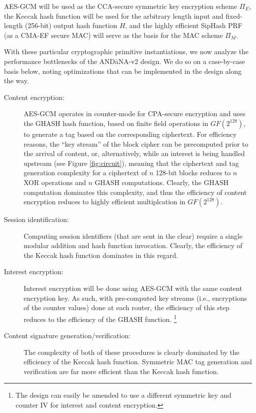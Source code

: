 \documentclass[10pt]{article}
\begin{document}

AES-GCM will be used as the CCA-secure symmetric key encryption scheme $\Pi_E$, the Keccak hash function will be used for the arbitrary length input and fixed-length (256-bit) output hash function $H$, and the highly efficient SipHash PRF (as a CMA-EF secure MAC) will serve as the basis for the MAC scheme $\Pi_M$.

With these particular cryptographic primitive instantiations, we now analyze the performance bottlenecks of the {\sf AND\=aNA-v2} design. We do so on a case-by-case basis below, noting optimizations that can be implemented in the design along the way.
\begin{description}
  \item[Content encryption:] AES-GCM operates in counter-mode for CPA-secure encryption and uses the GHASH hash function, based on finite field operations in $GF(2^{128})$, to generate a tag based on the corresponding ciphertext. For efficiency reasons, the ``key stream'' of the block cipher can be precomputed prior to the arrival of content, or, alternatively, while an interest is being handled upstream (see Figure \ref{fig:circuit}), meaning that the ciphertext and tag generation complexity for a ciphertext of $n$ 128-bit blocks reduces to $n$ XOR operations and $n$ GHASH computations. Clearly, the GHASH computation dominates this complexity, and thus the efficiency of content encryption reduces to highly efficient multiplcation in $GF(2^{128})$. 
  \item[Session identification:] Computing session identifiers (that are sent in the clear) require a single modular addition and hash function invocation. Clearly, the efficiency of the Keccak hash function dominates in this regard.
  \item[Interest encryption:] Interest encryption will be done using AES-GCM with the same content encryption key. As such, with pre-computed key streams (i.e., encryptions of the counter values) done at each router, the efficiency of this step reduces to the efficiency of the GHASH function. \footnote{The design can easily be amended to use a different symmetric key and counter IV for interest and content encryption.}
  \item[Content signature generation/verification:] The complexity of both of these procedures is clearly dominated by the efficiency of the Keccak hash function. Symmetric MAC tag generation and verification are far more efficient than the Keccak hash function.
\end{description}
\end{document}
